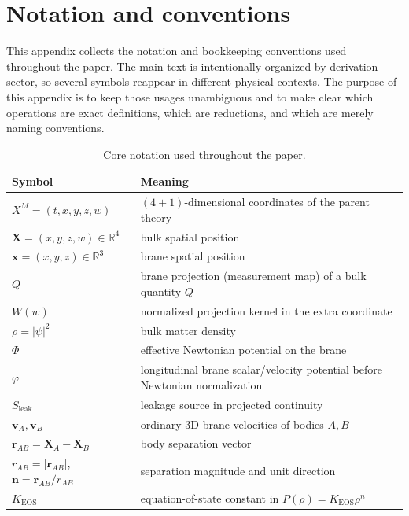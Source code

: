 \documentclass[11pt]{article}
\newcommand{\R}{\mathbb R}
\newcommand{\X}{\mathbf X}
\newcommand{\x}{\mathbf x}
\newcommand{\vct}{\mathbf v}
\newcommand{\nvec}{\mathbf n}
\newcommand{\Wproj}{W}
\newcommand{\Proj}[1]{\overline{#1}}
\newcommand{\KEOS}{K_{\mathrm{EOS}}}
\newcommand{\PhiN}{\Phi}
\newcommand{\phibr}{\varphi}
\newcommand{\Sleak}{S_{\mathrm{leak}}}
\begin{document}
\appendix

\section{Notation and conventions}
\label{app:notation}

This appendix collects the notation and bookkeeping conventions used throughout the paper.
The main text is intentionally organized by derivation sector, so several symbols reappear
in different physical contexts. The purpose of this appendix is to keep those usages
unambiguous and to make clear which operations are exact definitions, which are reductions,
and which are merely naming conventions.

\begin{table}[H]
  \centering
  \caption{Core notation used throughout the paper.}
  \label{tab:notation-core}
  \small
  \renewcommand{\arraystretch}{1.15}
  \begin{tabularx}{\linewidth}{@{}L L@{}}
    \toprule
    Symbol & Meaning \\
    \midrule
    \(X^M=(t,x,y,z,w)\) & \((4+1)\)-dimensional coordinates of the parent theory \\
    \(\X=(x,y,z,w)\in\R^4\) & bulk spatial position \\
    \(\x=(x,y,z)\in\R^3\) & brane spatial position \\
    \(\Proj{Q}\) & brane projection (measurement map) of a bulk quantity \(Q\) \\
    \(\Wproj(w)\) & normalized projection kernel in the extra coordinate \\
    \(\rho=|\psi|^2\) & bulk matter density \\
    \(\PhiN\) & effective Newtonian potential on the brane \\
    \(\phibr\) & longitudinal brane scalar/velocity potential before Newtonian normalization \\
    \(\Sleak\) & leakage source in projected continuity \\
    \(\vct_A,\vct_B\) & ordinary 3D brane velocities of bodies \(A,B\) \\
    \(\mathbf r_{AB}=\mathbf X_A-\mathbf X_B\) & body separation vector \\
    \(r_{AB}=|\mathbf r_{AB}|\), \(\nvec=\mathbf r_{AB}/r_{AB}\) & separation magnitude and unit direction \\
    \(\KEOS\) & equation-of-state constant in \(P(\rho)=\KEOS\rho^n\) \\

\end{tabularx}
\end{table}
\end{document}
